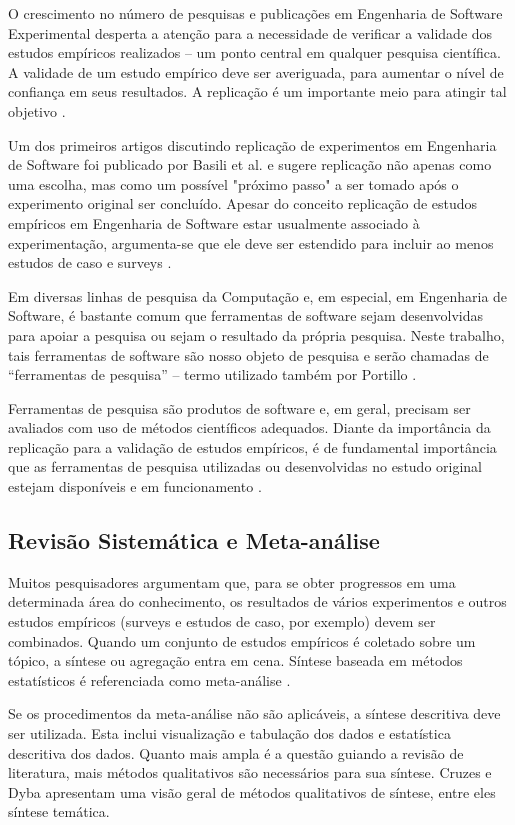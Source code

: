 \documentclass[12pt]{article}
\begin{document}
O crescimento no número de pesquisas e publicações em Engenharia de Software
Experimental desperta a atenção para a necessidade de verificar a validade dos
estudos empíricos realizados -- um ponto central em qualquer pesquisa
científica. A validade de um estudo empírico  deve ser averiguada, para
aumentar o nível de confiança em seus resultados. A replicação é um importante
meio para atingir tal objetivo \cite{Almqvist2006}.

Um dos primeiros artigos discutindo replicação de experimentos em Engenharia
de Software foi publicado por Basili et al. \cite{Mantyla2010} e sugere
replicação não apenas como uma escolha, mas como um possível "próximo passo" a
ser tomado após o experimento original ser concluído. Apesar do conceito
replicação de estudos empíricos em Engenharia de Software estar usualmente
associado à experimentação, argumenta-se que ele deve ser estendido para
incluir ao menos estudos de caso e surveys \cite{Basili1986}.

Em diversas linhas de pesquisa da Computação e, em especial, em Engenharia de
Software, é bastante comum que ferramentas de software sejam desenvolvidas
para apoiar a pesquisa ou sejam o resultado da própria pesquisa. Neste
trabalho, tais ferramentas de software são nosso objeto de pesquisa e serão
chamadas de “ferramentas de pesquisa” -- termo utilizado também por Portillo
\cite{Portillo12}.

Ferramentas de pesquisa são produtos de software e, em geral, precisam ser
avaliados com uso de métodos científicos adequados. Diante da importância da
replicação para a validação de estudos empíricos, é de fundamental importância
que as ferramentas de pesquisa utilizadas ou desenvolvidas no estudo original
estejam disponíveis e em funcionamento \cite{Kon2011}.

\subsection{Revisão Sistemática e Meta-análise}

Muitos pesquisadores argumentam que, para se obter progressos em uma
determinada área do conhecimento, os resultados de vários experimentos e
outros estudos empíricos (surveys e estudos de caso, por exemplo) devem ser
combinados. Quando um conjunto de estudos empíricos é coletado sobre um
tópico, a síntese ou agregação entra em cena. Síntese baseada em métodos
estatísticos é referenciada como meta-análise \cite{Almqvist2006}.

Se os procedimentos da meta-análise não são aplicáveis, a síntese descritiva
deve ser utilizada. Esta inclui visualização e tabulação dos dados e
estatística descritiva dos dados. Quanto mais ampla é a questão guiando a
revisão de literatura, mais métodos qualitativos são necessários para sua
síntese. Cruzes e Dyba \cite{Cruzes2011} apresentam uma visão geral de métodos
qualitativos de síntese, entre eles síntese temática.
\end{document}
